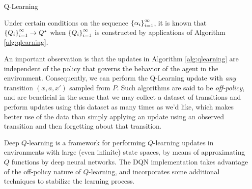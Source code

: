 \begin{algorithm}[h]
  \begin{algorithmic}
    \caption{Q-Learning}\label{alg:qlearning}
  \end{algorithmic}
\end{algorithm}

Under certain conditions on the sequence $\indexedint{i}{\infty}{\alpha}$, it
is known that $\indexedint{i}{\infty}{Q}\to Q^\star$
\citep{bertsekas1996neuro} when $\indexedint{i}{\infty}{Q}$ is
constructed by applications of Algorithm \ref{alg:qlearning}.

An important observation is that the updates in Algorithm
\ref{alg:qlearning} are independent of the policy that governs the
behavior of the agent in the environment. Consequently, we can perform
the Q-Learning update with \emph{any} transition $(x, a, x')$ sampled
from $P$. Such algorithms are said to be \emph{off-policy}, and are
beneficial in the sense that we may collect a dataset of transitions
and perform updates using this dataset as many times as we'd like,
which makes better use of the data than simply applying an update
using an observed transition and then forgetting about that transition.

Deep $Q$-learning is a framework for performing $Q$-learning
updates in environments with large (even infinite) state spaces, by means
of approximating $Q$ functions by deep neural networks. The DQN
implementation takes advantage of the off-policy nature of
$Q$-learning, and incorporates some additional techniques to stabilize the
learning process.


